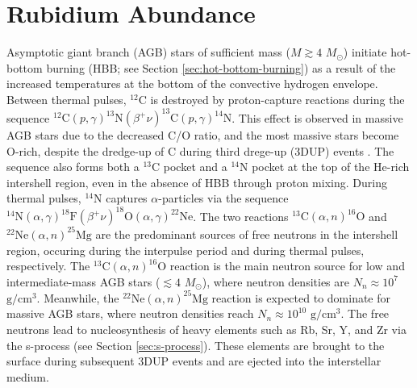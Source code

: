 \section{Rubidium Abundance} \label{sec:Rb_Abundance}






Asymptotic giant branch (AGB) stars of sufficient mass ($M \gtrsim 4$ $M_{\odot}$) initiate hot-bottom burning (HBB; see Section \ref{sec:hot-bottom-burning}) as a result of the increased temperatures at the bottom of the convective hydrogen envelope. Between thermal pulses, $^{12}$C is destroyed by proton-capture reactions during the sequence $^{12}\mathrm{C}(p,\gamma)^{13}\mathrm{N}(\beta^{+}\nu)^{13}\mathrm{C}(p,\gamma)^{14}\mathrm{N}$. This effect is observed in massive AGB stars due to the decreased C/O ratio, and the most massive stars become O-rich, despite the dredge-up of C during third drege-up (3DUP) events \cite{Garcia2006}. The sequence also forms both a $^{13}$C pocket and a $^{14}$N pocket at the top of the He-rich intershell region, even in the absence of HBB through proton mixing. During thermal pulses, $^{14}$N captures $\alpha$-particles via the sequence $^{14}\mathrm{N}(\alpha,\gamma)^{18}\mathrm{F}(\beta^{+}\nu)^{18}\mathrm{O}(\alpha,\gamma)^{22}\mathrm{Ne}$. The two reactions $^{13}\mathrm{C}(\alpha,n)^{16}\mathrm{O}$ and $^{22}\mathrm{Ne}(\alpha,n)^{25}\mathrm{Mg}$ are the predominant sources of free neutrons in the intershell region, occuring during the interpulse period and during thermal pulses, respectively. The $^{13}\mathrm{C}(\alpha,n)^{16}\mathrm{O}$ reaction is the main neutron source for low and intermediate-mass AGB stars ($\lesssim 4$ $M_{\odot}$), where neutron densities are $N_{n} \approx 10^{7}$ $\mathrm{g}/\mathrm{cm}^{3}$. Meanwhile, the $^{22}\mathrm{Ne}(\alpha,n)^{25}\mathrm{Mg}$ reaction is expected to dominate for massive AGB stars, where neutron densities reach $N_{n} \approx 10^{10}$ $\mathrm{g}/\mathrm{cm}^{3}$. The free neutrons lead to nucleosynthesis of heavy elements such as Rb, Sr, Y, and Zr via the s-process (see Section \ref{sec:s-process}). These elements are brought to the surface during subsequent 3DUP events and are ejected into the interstellar medium. 

